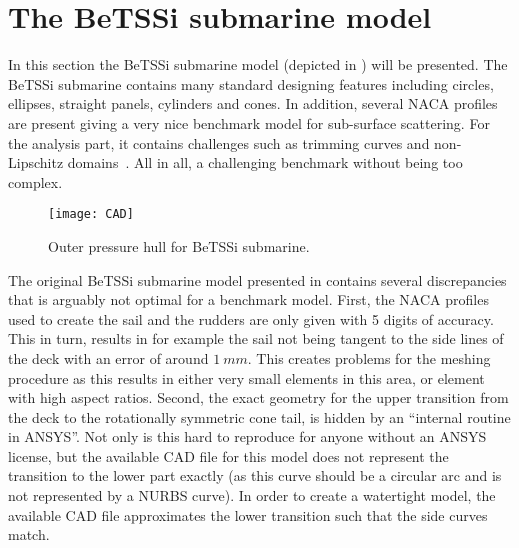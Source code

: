\section{The BeTSSi submarine model}
\label{Sec3:BeTSSi_description}
In this section the BeTSSi \cite{Nolte2014bib} submarine model (depicted in ) will be presented. The BeTSSi submarine contains many standard designing features including circles, ellipses, straight panels, cylinders and cones. In addition, several NACA profiles are present giving a very nice benchmark model for sub-surface scattering. For the analysis part, it contains challenges such as trimming curves and non-Lipschitz domains~\cite{Lipton2010roi}. All in all, a challenging benchmark without being too complex.
\begin{figure}
	\centering
	\texttt{[image: CAD]}
	\caption{Outer pressure hull for BeTSSi submarine.}
	\label{Fig3:BeTSSi_BC}
\end{figure}

The original BeTSSi submarine model presented in  \cite{Nolte2014bib} contains several discrepancies that is arguably not optimal for a benchmark model. First, the NACA profiles used to create the sail and the rudders are only given with 5 digits of accuracy. This in turn, results in for example the sail not being tangent to the side lines of the deck with an error of around $\SI{1}{mm}$. This creates problems for the meshing procedure as this results in either very small elements in this area, or element with high aspect ratios. Second, the exact geometry for the upper transition from the deck to the rotationally symmetric cone tail, is hidden by an ``internal routine in ANSYS''. Not only is this hard to reproduce for anyone without an ANSYS license, but the available CAD file for this model does not represent the transition to the lower part exactly (as this curve should be a circular arc and is not represented by a NURBS curve). In order to create a watertight model, the available CAD file approximates the lower transition such that the side curves match. 

